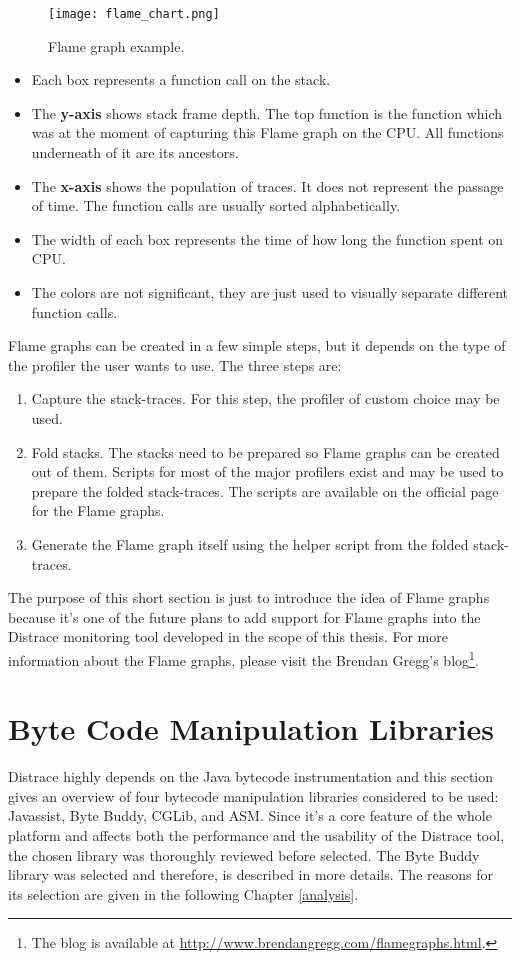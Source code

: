\begin{figure}
	\centering
	\texttt{[image: flame\_chart.png]}
	\caption{Flame graph example.}
	\label{fig:flame_chart}
\end{figure}

\begin{itemize}
	\item Each box represents a function call on the stack.
	\item The \textbf{y-axis} shows stack frame depth. The top function is the function which was at the moment of capturing this Flame graph on the CPU. All functions underneath of it are its ancestors.
	\item The \textbf{x-axis} shows the population of traces. It does not represent the passage of time. The function calls are usually sorted alphabetically.
	\item The width of each box represents the time of how long the function spent on CPU.
	\item The colors are not significant, they are just used to visually separate different function calls.
\end{itemize}

Flame graphs can be created in a few simple steps, but it depends on the type of the profiler the user wants to use. The three steps are:
\begin{enumerate}
	\item Capture the stack-traces. For this step, the profiler of custom choice may be used.
	\item Fold stacks. The stacks need to be prepared so Flame graphs can be created out of them. Scripts for most of the major profilers exist and may be used to prepare the folded stack-traces. The scripts are available on the official page for the Flame graphs.
	\item Generate the Flame graph itself using the helper script from the folded stack-traces.
\end{enumerate}

The purpose of this short section is just to introduce the idea of Flame graphs because it's one of the future plans to add support for Flame graphs into the Distrace monitoring tool developed in the scope of this thesis. For more information about the Flame graphs, please visit the Brendan Gregg's blog\footnote{The blog is available at \url{http://www.brendangregg.com/flamegraphs.html}.}.
\section{Byte Code Manipulation Libraries}
Distrace highly depends on the Java bytecode instrumentation and this section gives an overview of four bytecode manipulation libraries considered to be used: Javassist, Byte Buddy, CGLib, and ASM. Since it's a core feature of the whole platform and affects both the performance and the usability of the Distrace tool, the chosen library was thoroughly reviewed before selected. The Byte Buddy library was selected and therefore, is described in more details. The reasons for its selection are given in the following Chapter \ref{analysis}.

